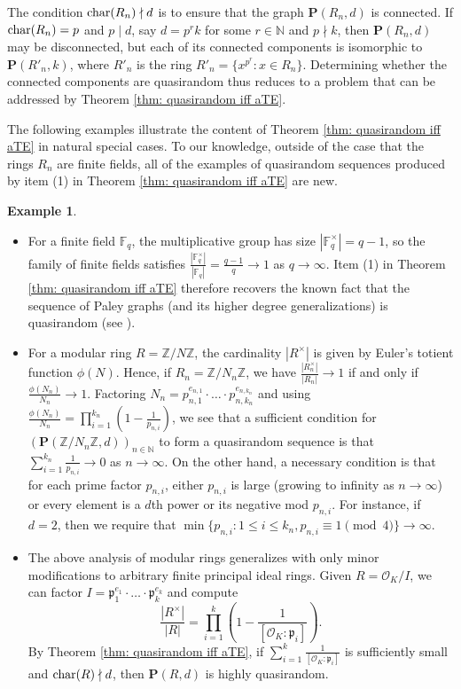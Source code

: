 \documentclass{amsart}
\theoremstyle{definition}
\newtheorem{example}[theorem]{Example}
\numberwithin{equation}{section}
\newcommand{\N}{\mathbb{N}}
\newcommand{\Z}{\mathbb{Z}}
\newcommand{\F}{\mathbb{F}}
\newcommand{\p}{\mathfrak{p}}
\newcommand{\bfP}{\mathbf{P}}
\newcommand{\mO}{\mathcal{O}}
\renewcommand{\char}{\textup{char}}
\begin{document}
The condition $\textup{char}(R_n) \nmid d$ is to ensure that the graph $\bfP(R_n,d)$ is connected.
If $\char(R_n) = p$ and $p \mid d$, say $d = p^r k$ for some $r \in \N$ and $p \nmid k$, then $\bfP(R_n,d)$ may be disconnected, but each of its connected components is isomorphic to $\bfP(R'_n,k)$, where $R'_n$ is the ring $R'_n = \{x^{p^r} : x \in R_n\}$.
Determining whether the connected components are quasirandom thus reduces to a problem that can be addressed by Theorem \ref{thm: quasirandom iff aTE}.

The following examples illustrate the content of Theorem \ref{thm: quasirandom iff aTE} in natural special cases.
To our knowledge, outside of the case that the rings $R_n$ are finite fields, all of the examples of quasirandom sequences produced by item (1) in Theorem \ref{thm: quasirandom iff aTE} are new.

\begin{example} \label{eg: Paley-type graphs}~
    \begin{itemize}
        \item For a finite field $\F_q$, the multiplicative group has size $|\F_q^{\times}| = q - 1$, so the family of finite fields satisfies $\frac{|\F_q^{\times}|}{|\F_q|} = \frac{q-1}{q} \to 1$ as $q \to \infty$.
        Item (1) in Theorem \ref{thm: quasirandom iff aTE} therefore recovers the known fact that the sequence of Paley graphs (and its higher degree generalizations) is quasirandom (see \cite[Section 5]{cgw}).
        \item For a modular ring $R = \Z/N\Z$, the cardinality $|R^{\times}|$ is given by Euler's totient function $\phi(N)$.
        Hence, if $R_n = \Z/N_n\Z$, we have $\frac{|R_n^{\times}|}{|R_n|} \to 1$ if and only if $\frac{\phi(N_n)}{N_n} \to 1$.
        Factoring $N_n = p_{n,1}^{e_{n,1}} \cdot \ldots \cdot p_{n,k_n}^{e_{n,k_n}}$ and using $\frac{\phi(N_n)}{N_n} = \prod_{i=1}^{k_n} \left( 1 - \frac{1}{p_{n,i}} \right)$, we see that a sufficient condition for $(\bfP(\Z/N_n\Z,d))_{n \in \N}$ to form a quasirandom sequence is that $\sum_{i=1}^{k_n} \frac{1}{p_{n,i}} \to 0$ as $n \to \infty$.
        On the other hand, a necessary condition is that for each prime factor $p_{n,i}$, either $p_{n,i}$ is large (growing to infinity as $n \to \infty$) or every element is a $d$th power or its negative mod $p_{n,i}$.
        For instance, if $d = 2$, then we require that $\min\{p_{n,i} : 1 \le i \le k_n, p_{n,i} \equiv 1 \pmod{4}\} \to \infty$.
        \item The above analysis of modular rings generalizes with only minor modifications to arbitrary finite principal ideal rings.
        Given $R = \mO_K/I$, we can factor $I = \p_1^{e_1} \cdot \ldots \cdot \p_k^{e_k}$ and compute
        \begin{equation*}
            \frac{|R^{\times}|}{|R|} = \prod_{i=1}^k \left( 1 - \frac{1}{[\mO_K:\p_i]} \right).
        \end{equation*}
        By Theorem \ref{thm: quasirandom iff aTE}, if $\sum_{i=1}^k \frac{1}{[\mO_K : \p_i]}$ is sufficiently small and $\char(R) \nmid d$, then $\bfP(R,d)$ is highly quasirandom.
    \end{itemize}
\end{example}
\end{document}
